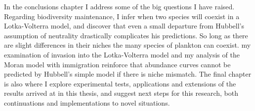 In the conclusions chapter I address some of the big questions I have raised. 
Regarding biodiversity maintenance, I infer when two species will coexist in a Lotka-Volterra model, and discover that even a small departure from Hubbell's assumption of neutrality drastically complicates his predictions. %
So long as there are slight differences in their niches the many species of plankton can coexist. 
my examination of invasion into the Lotka-Volterra model and my analysis of the Moran model with immigration reinforce that abundance curves cannot be predicted by Hubbell's simple model if there is niche mismatch. %
The final chapter is also where I explore experimental tests, applications and extensions of the results arrived at in this thesis, and suggest next steps for this research, both continuations and implementations to novel situations. 

